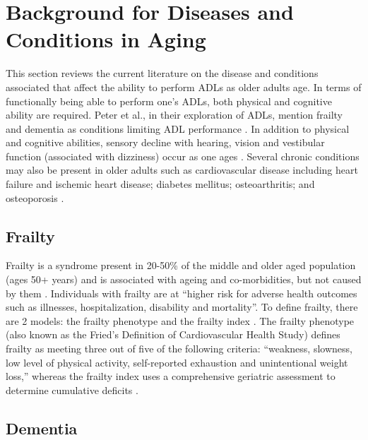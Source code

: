 \section{Background for Diseases and Conditions in Aging}\label{sec:bg_disease}

This section reviews the current literature on the disease and conditions associated that affect the ability to perform ADLs as older adults age. In terms of functionally being able to perform one's ADLs, both physical and cognitive ability are required. Peter et al., in their exploration of ADLs, mention frailty and dementia as conditions limiting ADL performance \cite{edemekong_activities_2022}. In addition to physical and cognitive abilities, sensory decline with hearing, vision and vestibular function (associated with dizziness) occur as one ages \cite{jaul_age-related_2017}. Several chronic conditions may also be present in older adults such as cardiovascular disease including heart failure and ischemic heart disease; diabetes mellitus; osteoarthritis; and osteoporosis \cite{jaul_age-related_2017}.


\subsection{Frailty}


Frailty is a syndrome present in 20-50\% of the middle and older aged population (ages 50+ years) \cite{hewitt_prevalence_2018} and is associated with ageing and co-morbidities, but not caused by them \cite{conroy_defining_2009}. Individuals with frailty are at “higher risk for adverse health outcomes such as illnesses, hospitalization, disability and mortality”. To define frailty, there are 2 models: the frailty phenotype and the frailty index \cite{chen_frailty_2014}. The frailty phenotype (also known as the Fried’s Definition of Cardiovascular Health Study) defines frailty as meeting three out of five of the following criteria: “weakness, slowness, low level of physical activity, self-reported exhaustion and unintentional weight loss,” whereas the frailty index uses a comprehensive geriatric assessment to determine cumulative deficits \cite{chen_frailty_2014}. 

\subsection{Dementia}

